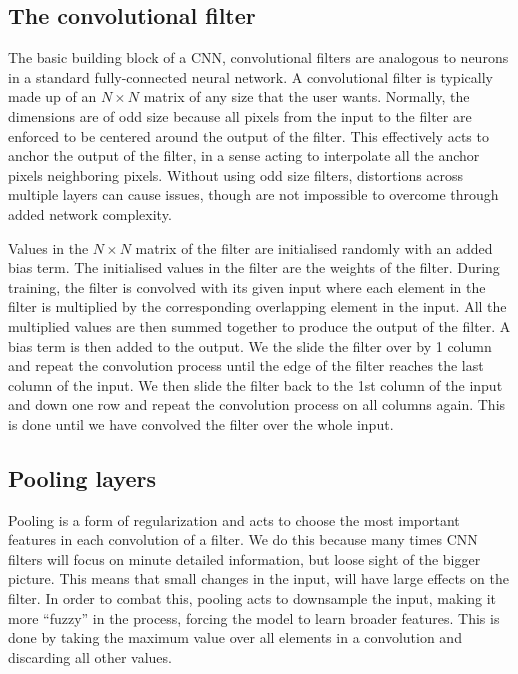 \subsection{The convolutional filter}

% 
% 
The basic building block of a \ac{CNN}, convolutional 
filters are analogous to neurons in a standard fully-connected 
neural network. A convolutional filter is typically made up of 
an $N \times N$ matrix of any size that the user wants. Normally, 
the dimensions are of odd size because all pixels from the input 
to the filter are enforced to be centered around the output 
of the filter. This effectively acts to anchor the output 
of the filter, in a sense acting to interpolate all 
the anchor pixels neighboring pixels. Without using odd size filters, distortions 
across multiple layers can cause issues, though are not impossible 
to overcome through added network complexity.

Values in the $N \times N$ matrix of the filter are initialised 
randomly with an added bias term. The initialised values in the 
filter are the weights of the filter. During training, the filter is 
convolved with its given input where each element in the filter 
is multiplied by the corresponding overlapping element in the 
input. All the multiplied values are then summed together to produce 
the output of the filter. A bias term is then added to the 
output. We the slide the filter over by 1 column and repeat 
the convolution process until the edge of the filter reaches 
the last column of the input. We then slide the filter back to 
the 1st column of the input and down one row and repeat 
the convolution process on all columns again. This is done 
until we have convolved the filter over the whole input.

\subsection{Pooling layers}
Pooling is a form of regularization and acts to choose 
the most important features in each convolution of a filter. 
We do this because many times \ac{CNN} filters will focus 
on minute detailed information, but loose sight of the 
bigger picture. This means that small changes in the 
input, will have large effects on the filter. In order to 
combat this, pooling acts to downsample the input, making 
it more ``fuzzy'' in the process, forcing the model 
to learn broader features.
This is done by taking the maximum value over all elements 
in a convolution and discarding all other values. 

